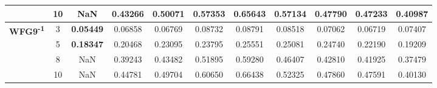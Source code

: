 \documentclass[conference]{IEEEtran}
\begin{document}
\begin{table*}[!htb]
\begin{tabular}{|c|c|c|c|c|c|c|c|c|c|c|}
		& 10         & NaN              & 0.43266           & 0.50071               & 0.57353          & 0.65643             & 0.57134             & 0.47790            & 0.47233              & 0.40987          \\ \hline
		\multirow{4}{*}{\textbf{WFG9\textsuperscript{-1}}}  & 3          & \textbf{0.05449} & 0.06858           & 0.06769               & 0.08732          & 0.08791             & 0.08518             & 0.07062            & 0.06719              & 0.07407          \\ \cline{2-11} 
		& 5          & \textbf{0.18347} & 0.20468           & 0.23095               & 0.23795          & 0.25551             & 0.25081             & 0.24740            & 0.22190              & 0.19209          \\ \cline{2-11} 
		& 8          & NaN              & 0.39243           & 0.43482               & 0.51895          & 0.59280             & 0.46407             & 0.42810            & 0.41925              & 0.37479          \\ \cline{2-11} 
		& 10         & NaN              & 0.44781           & 0.49704               & 0.60650          & 0.66438             & 0.52325             & 0.47860            & 0.47591              & 0.40130          \\ \hline
	\end{tabular}
\end{table*} 
  



 
\balance 
\small{
}
\end{document}
